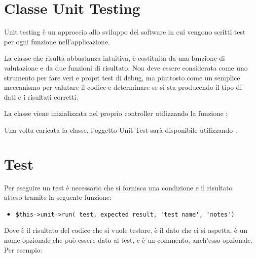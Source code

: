 \section{Classe Unit Testing}
\label{class:unittest}

Unit testing è un approccio allo sviluppo del software in cui vengono scritti test per ogni funzione nell'applicazione. 


La classe che risulta abbastanza intuitiva, è costituita da una funzione di valutazione e da due funzioni di risultato. Non deve essere considerata come uno strumento per fare veri e propri test di debug, ma piuttosto come un semplice meccanismo per valutare il codice e determinare se si sta producendo il tipo di dati e i risultati corretti.

La classe viene inizializzata nel proprio controller utilizzando la funzione :


Una volta caricata la classe, l'oggetto Unit Test sarà disponibile utilizzando .

\section*{Test}
Per eseguire un test è necessario che si fornisca una condizione e il risultato atteso tramite la seguente funzione:

\begin{itemize}
\item \verb|$this->unit->run( test, expected result, 'test name', 'notes')|
\end{itemize}

Dove  è il risultato del codice che si vuole testare,  è il dato che ci si aspetta,  è un nome opzionale che può essere dato al test, e  è un commento, anch'esso opzionale. Per esempio:


